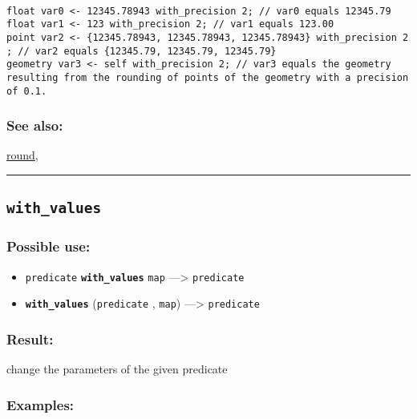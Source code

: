 \documentclass[]{book}
\providecommand{\tightlist}{%
  \setlength{\itemsep}{0pt}\setlength{\parskip}{0pt}}
\theoremstyle{definition}
\theoremstyle{definition}
\theoremstyle{definition}
\theoremstyle{remark}
\begin{document}
\begin{verbatim}
 
float var0 <- 12345.78943 with_precision 2; // var0 equals 12345.79 
float var1 <- 123 with_precision 2; // var1 equals 123.00 
point var2 <- {12345.78943, 12345.78943, 12345.78943} with_precision 2 ; // var2 equals {12345.79, 12345.79, 12345.79} 
geometry var3 <- self with_precision 2; // var3 equals the geometry resulting from the rounding of points of the geometry with a precision of 0.1.
\end{verbatim}

\subsubsection{See also:}\label{see-also-224}

\href{OperatorsNR\#round}{round},

\begin{center}\rule{0.5\linewidth}{\linethickness}\end{center}

\subsection{\texorpdfstring{\texttt{with\_values}}{with\_values}}\label{with_values}

\subsubsection{Possible use:}\label{possible-use-561}

\begin{itemize}
\tightlist
\item
  \texttt{predicate} \textbf{\texttt{with\_values}} \texttt{map}
  ---\textgreater{} \texttt{predicate}
\item
  \textbf{\texttt{with\_values}} (\texttt{predicate} , \texttt{map})
  ---\textgreater{} \texttt{predicate}
\end{itemize}

\subsubsection{Result:}\label{result-540}

change the parameters of the given predicate

\subsubsection{Examples:}\label{examples-388}
\end{document}
